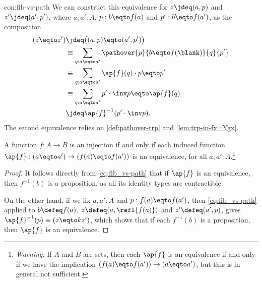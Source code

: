 \begin{implementation}{con:fib-vs-path}
  We can construct this equivalence for $z\jdeq(a,p)$ and $z'\jdeq(a',p')$,
  where $a,a':A$, $p:b \eqto f(a)$ and $p':b \eqto f(a')$,
  as the composition
  \begin{align*}
    (z \eqto z')
    &\jdeq \bigl( (a,p) \eqto (a',p') \bigr) \\
    &\equiv \sum_{q : a \eqto a'} \pathover{p}{b \eqto f(\blank)}{q}{p'} \\
    &\equiv \sum_{q : a \eqto a'} \ap{f}(q) \cdot p \eqto p' \\
    &\equiv \sum_{q : a \eqto a'} p' \cdot \inv p \eqto \ap{f}(q) \\
    &\jdeq \ap{f}^{-1}(p' \cdot \inv p).
  \end{align*}
  The second equivalence relies on \cref{def:pathover-trp}
  and \cref{lem:trp-in-fx=Ygx}.
\end{implementation}

\begin{lemma}\label{lem:eqandcovofconntypes}
  A function $f:A\to B$ is an injection if and only if
  each induced function
  $\ap{f}: (a \eqto a') \to (f(a) \eqto f(a'))$ is an equivalence,
  for all $a,a':A$.\footnote{%
    \emph{Warning:}
    If $A$ and $B$ are sets, then each $\ap{f}$ is an equivalence
    if and only if we have the implication $(f(a) \eqto f(a')) \to (a \eqto a')$,
    but this is in general not sufficient.}
\end{lemma}

\begin{proof}
  It follows directly from \eqref{eq:fib_vs-path}
  that if $\ap{f}$ is an equivalence,
  then $f^{-1}(b)$ is a proposition,
  as all its identity types are contractible.

  On the other hand, if we fix $a,a':A$ and $p:f(a) \eqto f(a')$,
  then \eqref{eq:fib_vs-path} applied to $b \defeq f(a)$,
  $z \defeq (a,\refl{f(a)})$ and
  $z' \defeq (a',p)$,
  gives $\ap{f}^{-1}(p) \equiv (z \eqto kz')$,
  which shows that if each $f^{-1}(b)$ is a proposition,
  then $\ap{f}$ is an equivalence.
\end{proof}


